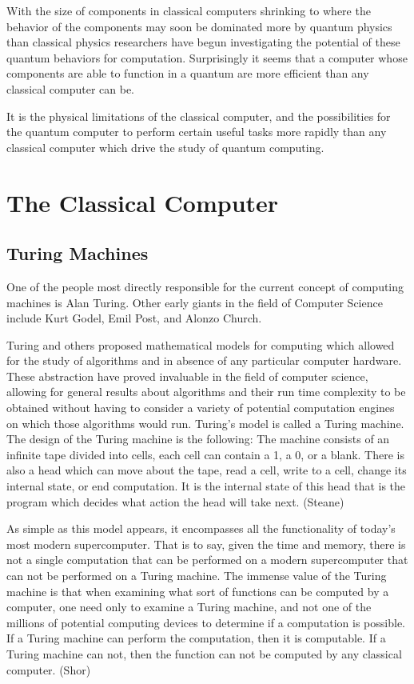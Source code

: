 \documentclass[]{article}
\begin{document}
With the size of components in classical computers shrinking to where
the behavior of the components may soon be dominated more by quantum
physics than classical physics researchers have begun investigating
the potential of these quantum behaviors for computation.
Surprisingly it seems that a computer whose components are able to
function in a quantum are more efficient than any classical computer
can be.

It is the physical limitations of the classical computer, and the
possibilities for the quantum computer to perform certain useful tasks
more rapidly than any classical computer which drive the study of
quantum computing.
	
\section{The Classical Computer}

\subsection{Turing Machines}
	
One of the people most directly responsible for the current concept of
computing machines is Alan Turing.  Other early giants in the field of
Computer Science include Kurt Godel, Emil Post, and Alonzo Church.

Turing and others proposed mathematical models for computing which
allowed for the study of algorithms and in absence of any particular
computer hardware.  These abstraction have proved invaluable in the
field of computer science, allowing for general results about
algorithms and their run time complexity to be obtained without having
to consider a variety of potential computation engines on which those
algorithms would run.  Turing's model is called a Turing machine. The
design of the Turing machine is the following: The machine consists of
an infinite tape divided into cells, each cell can contain a 1, a 0,
or a blank.  There is also a head which can move about the tape, read
a cell, write to a cell, change its internal state, or end
computation.  It is the internal state of this head that is the
program which decides what action the head will take next. (Steane)

As simple as this model appears, it encompasses all the functionality
of today's most modern supercomputer.  That is to say, given the time
and memory, there is not a single computation that can be performed on
a modern supercomputer that can not be performed on a Turing machine.
The immense value of the Turing machine is that when examining what
sort of functions can be computed by a computer, one need only to examine
a Turing machine, and not one of the millions of potential computing
devices to determine if a computation is possible.  If a Turing
machine can perform the computation, then it is computable.  If a
Turing machine can not, then the function can not be computed by any
classical computer. (Shor)
\end{document}

